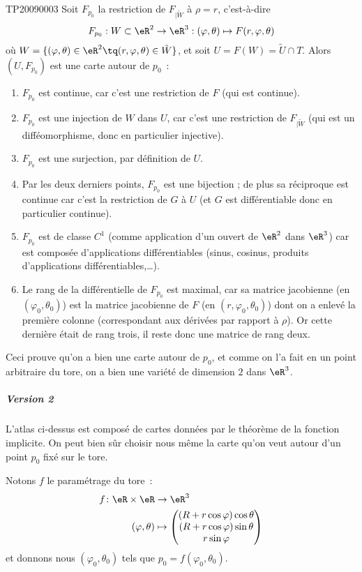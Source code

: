 \begin{corrige}{TP20090003}
Soit $F_{p_0}$ la restriction de $F_{| \tilde W}$ à $\rho = r$, c'est-à-dire
\begin{equation*}
  F_{p_0} : W \subset \eR^2 \to \eR^3 : (\varphi,\theta) \mapsto F(r,\varphi,\theta)
\end{equation*}
où $W = \{ (\varphi,\theta) \in \eR^2 \tq (r,\varphi,\theta) \in \tilde
W\}$, et soit $U = F(W) = \tilde U \cap T$. Alors $(U, F_{p_0})$ est
une carte autour de $p_0$~:
\begin{enumerate}
\item $F_{p_0}$ est continue, car c'est une restriction de $F$ (qui est
  continue).
\item $F_{p_0}$ est une injection de $W$ dans $U$, car c'est une
  restriction de $F_{| \tilde W}$ (qui est un difféomorphisme,
  donc en particulier injective).
\item $F_{p_0}$ est une surjection, par définition de $U$.
\item Par les deux derniers points, $F_{p_0}$ est une bijection ; de
  plus sa réciproque est continue car c'est la restriction de $G$ à
  $U$ (et $G$ est différentiable donc en particulier continue).
\item $F_{p_0}$ est de classe $C^1$ (comme application d'un ouvert de
  $\eR^2$ dans $\eR^3$) car est composée d'applications
  différentiables (sinus, cosinus, produits d'applications
  différentiables,\dots).
\item Le rang de la différentielle de $F_{p_0}$ est maximal, car sa
  matrice jacobienne (en $(\varphi_0,\theta_0)$) est la matrice jacobienne de $F$
  (en $(r,\varphi_0,\theta_0)$) dont on a enlevé la première colonne
  (correspondant aux dérivées par rapport à $\rho$). Or cette dernière
  était de rang trois, il reste donc une matrice de rang deux.
\end{enumerate}

Ceci prouve qu'on a bien une carte autour de $p_0$, et comme on l'a
fait en un point arbitraire du tore, on a bien une variété de
dimension $2$ dans $\eR^3$.

\subparagraph{Version 2} L'atlas ci-dessus est composé de cartes
données par le théorème de la fonction implicite. On peut bien sûr
choisir nous même la carte qu'on veut autour d'un point $p_0$ fixé sur
le tore.

Notons $f$ le paramétrage du tore~:
\begin{equation}
	\begin{aligned}
		f\colon \eR\times\eR&\to \eR^3 \\
		(\varphi,\theta)&\mapsto \begin{pmatrix}
			(R+r\cos\varphi)\cos\theta	\\ 
			(R+r\cos\varphi)\sin\theta	\\ 
			r\sin\varphi	
		\end{pmatrix}
	\end{aligned}
\end{equation}
et donnons nous $(\varphi_0,\theta_0)$ tels que $p_0 =
f(\varphi_0,\theta_0)$.


\end{corrige}
